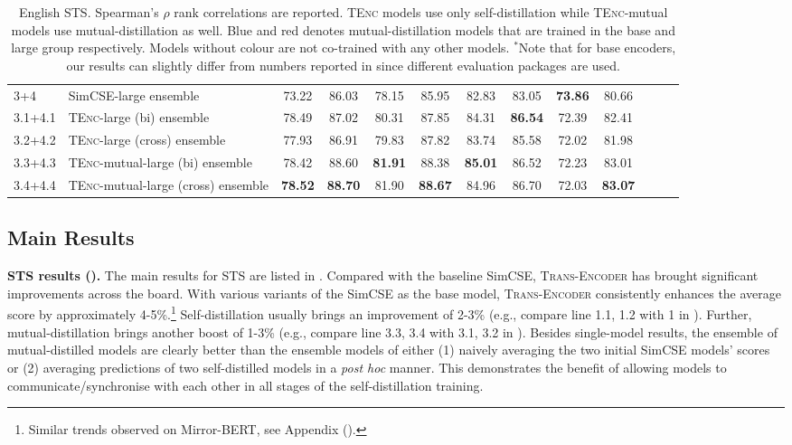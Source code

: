 \documentclass{article} \usepackage{iclr2021_conference,times}
\newcommand{\modelname}{\textsc{Trans-Encoder}\xspace}
\newcommand{\tenc}{\textsc{TEnc}\xspace}
\begin{document}
\begin{table}[!t]
\begin{tabular}{llccccccccccc}
\cmidrule[.5pt]{1-10}
3+4 &SimCSE-large ensemble & 73.22 & 86.03 & 78.15 & 85.95 & 82.83 & 83.05 & \textbf{73.86} & 80.66 \\
3.1+4.1 & \tenc-large (bi) ensemble & 78.49 & 87.02 & 80.31 & 87.85 & 84.31 & \textbf{86.54} & 72.39 & 82.41 \\
3.2+4.2 & \tenc-large (cross) ensemble & 77.93 & 86.91 & 79.83 & 87.82 & 83.74 & 85.58 & 72.02 & 81.98 \\
\rowcolor{red!5}
3.3+4.3 & \tenc-mutual-large (bi) ensemble & 78.42 & 88.60 & \textbf{81.91} & 88.38 & \textbf{85.01} & 86.52 & 72.23 & 83.01 \\
\rowcolor{red!5}
3.4+4.4 & \tenc-mutual-large (cross) ensemble & \textbf{78.52} & \textbf{88.70} & 81.90 & \textbf{88.67} & 84.96  & 86.70 & 72.03 & \textbf{83.07} \\
\cmidrule[1.5pt]{1-10}

\end{tabular}
\vspace{-1.0mm}
\caption{English STS. Spearman's $\rho$ rank correlations are reported. \tenc models use only self-distillation while \tenc-mutual models use mutual-distillation as well. \colorbox{blue!10}{Blue} and \colorbox{red!10}{red} denotes mutual-distillation models that are trained in the \colorbox{blue!10}{base} and \colorbox{red!10}{large} group respectively. Models without colour are not co-trained with any other models. $^\ast$Note that for base encoders, our results can slightly differ from numbers reported in \citep{gao2021simcse} since different evaluation packages are used.}
\label{tab:sts}
\vspace{-2.0mm}
\end{table}

\subsection{Main Results}

\textbf{STS results ().} The main results for STS are listed in . Compared with the baseline SimCSE, \modelname has brought significant improvements across the board. With various variants of the SimCSE as the base model, \modelname consistently enhances the average score by approximately 4-5\%.\footnote{Similar trends observed on Mirror-BERT, see Appendix ().} Self-distillation usually brings an improvement of 2-3\% (e.g., compare line 1.1, 1.2 with 1 in ). Further, mutual-distillation brings another boost of 1-3\% (e.g., compare line 3.3, 3.4 with 3.1, 3.2 in ).
Besides single-model results, the ensemble of mutual-distilled models are clearly better than the ensemble models of either (1) naively averaging the two initial SimCSE models' scores or (2) averaging predictions of two self-distilled models in a \textit{post hoc} manner. This demonstrates the benefit of allowing models to communicate/synchronise with each other in all stages of the self-distillation training.
\end{document}
